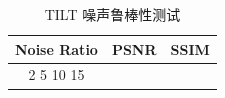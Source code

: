 \begin{table}[htbp]
\centering
\caption{TILT 噪声鲁棒性测试}
\label{tab:chapter6_tilt_robustness}
\small
\begin{tabular}{|c|c|c|}
\hline
Noise Ratio & PSNR & SSIM \\
\hline
2%
5%
10%
15%
\hline
\end{tabular}
\end{table}
